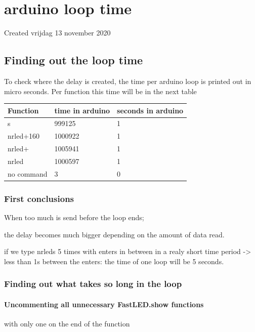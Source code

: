 \documentclass{article}
\begin{document}
		\section{arduino loop time}

Created vrijdag 13 november 2020



\subsection{Finding out the loop time}

To check where the delay is created, the time per arduino loop is printed out in micro seconds. Per function this time will be in the next table

\begin{tabular}{ |l|l|l| }
\hline
 Function & time in arduino & seconds in arduino \tabularnewline
\hline
\hline
 s & 999125 & 1 \tabularnewline
\hline
 nrled+160 & 1000922 & 1 \tabularnewline
\hline
 nrled+ & 1005941 & 1 \tabularnewline
\hline
 nrled & 1000597 & 1 \tabularnewline
\hline
 no command & 3 & 0 \tabularnewline
\hline
\end{tabular}




\subsubsection{First conclusions}

When too much is send before the loop ends; 

the delay becomes much bigger depending on the amount of data read. 

if we type nrleds 5 times with enters in between in a realy short time period -\textgreater{} less than 1s between the enters: the time of one loop will be 5 seconds.



\subsubsection{Finding out what takes so long in the loop}



\paragraph{Uncommenting all unnecessary FastLED.show functions}

with only one on the end of the function
\end{document}
